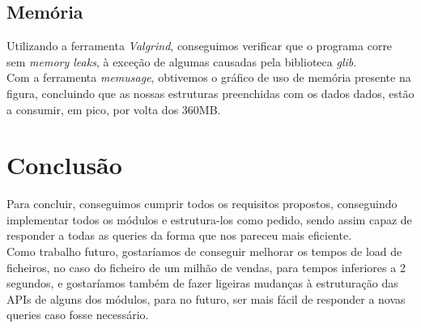 \documentclass[a4paper]{report}
\begin{document}
\section{Memória}

Utilizando a ferramenta \textit{Valgrind}, conseguimos verificar que o programa
corre sem \textit{memory leaks}, à exceção de algumas causadas pela biblioteca
\textit{glib}.\\

Com a ferramenta \textit{memusage}, obtivemos o gráfico de uso de memória presente
na figura, concluindo que as nossas estruturas preenchidas com
os dados dados, estão a consumir, em pico, por volta dos 360MB.

\chapter{Conclusão}

Para concluir, conseguimos cumprir todos os requisitos propostos, conseguindo implementar
todos os módulos e estrutura-los como pedido, sendo assim capaz de responder a todas as 
queries da forma que nos pareceu mais eficiente.\\
Como trabalho futuro, gostaríamos de conseguir melhorar os tempos de load de ficheiros,
no caso do ficheiro de um milhão de vendas, para tempos inferiores a 2 segundos, e
gostaríamos também de fazer ligeiras mudanças à estruturação das APIs de alguns dos 
módulos, para no futuro, ser mais fácil de responder a novas queries caso fosse 
necessário.

\appendix
\end{document}
